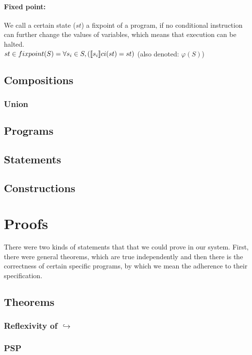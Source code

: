 \paragraph{Fixed point:}
We call a certain state ($st$) a fixpoint of a program, if no conditional instruction can further change the values of variables, which means that execution can be halted. \\
$st \in fixpoint(S) = \forall s_i \in S, (\llbracket s_i \rrbracket ci(st) = st)$ (also denoted: $\varphi(S)$)


\subsection{Compositions}

\subsubsection{Union}

\subsection{Programs}
\subsection{Statements}
\subsection{Constructions}

\section{Proofs}

There were two kinds of statements that that we could prove in our system. First, there were general theorems, which are true independently and then there is the correctness of certain specific programs, by which we mean the adherence to their specification.

\subsection{Theorems}

\subsubsection{Reflexivity of $\hookrightarrow$}

\subsubsection{PSP}

